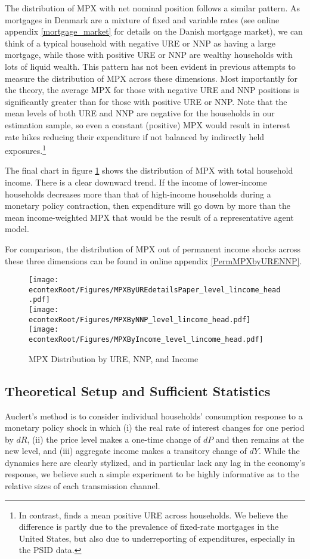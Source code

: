 \documentclass[titlepage]{\econtex}\newcommand{\texname}{ConsumptionHeterogeneity}
\begin{document}
The distribution of MPX with net nominal position follows a similar pattern. As mortgages in Denmark are a mixture of fixed and variable rates (see online appendix \ref{mortgage_market} for details on the Danish mortgage market), we can think of a typical household with negative URE or NNP as having a large mortgage, while those with positive URE or NNP are wealthy households with lots of liquid wealth. This pattern has not been evident in previous attempts to measure the distribution of MPX across these dimensions. Most importantly for the theory, the average MPX for those with negative URE and NNP positions is significantly greater than for those with positive URE or NNP. Note that the mean levels of both URE and NNP are negative for the households in our estimation sample, so even a constant (positive) MPX would result in interest rate hikes reducing their expenditure if not balanced by indirectly held exposures.\footnote{In contrast, \cite{auclert_monetary_2017} finds a mean positive URE across households. We believe the difference is partly due to the prevalence of fixed-rate mortgages in the United States, but also due to underreporting of expenditures, especially in the PSID data.}

The final chart in figure \ref{fig:MPCAuclert} shows the distribution of MPX with total household income. There is a clear downward trend. If the income of lower-income households decreases more than that of high-income households during a monetary policy contraction, then expenditure will go down by more than the mean income-weighted MPX that would be the result of a representative agent model.

For comparison, the distribution of  MPX out of permanent income shocks across these three dimensions can be found in online appendix \ref{PermMPXbyURENNP}.
\begin{figure} 
\begin{centering}
	\texttt{[image: \\econtexRoot/Figures/MPXByUREdetailsPaper\_level\_lincome\_head.pdf]} \\
	\texttt{[image: \\econtexRoot/Figures/MPXByNNP\_level\_lincome\_head.pdf]}
	\texttt{[image: \\econtexRoot/Figures/MPXByIncome\_level\_lincome\_head.pdf]}
	\caption{MPX Distribution by URE, NNP, and Income}
	\label{fig:MPCAuclert}
\end{centering}
\end{figure}

\subsection{Theoretical Setup and Sufficient Statistics}
Auclert's method is to consider individual households' consumption response to a monetary policy shock in which (i) the real rate of interest changes for one period by $dR$, (ii) the price level makes a one-time change of $dP$ and then remains at the new level, and (iii) aggregate income makes a transitory change of $dY$. While the dynamics here are clearly stylized, and in particular lack any lag in the economy's response, we believe such a simple experiment to be highly informative as to the relative sizes of each transmission channel.
\end{document}
